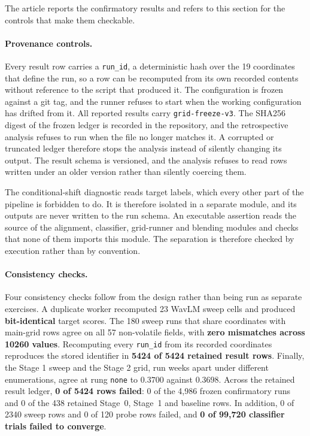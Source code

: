 \documentclass[a4paper,fleqn]{cas-dc}
\begin{document}
The article reports the confirmatory results and refers to this section for
the controls that make them checkable.

\paragraph{Provenance controls.} Every result row carries a
\texttt{run\_id}, a deterministic hash over the 19 coordinates that define the
run, so a row can be recomputed from its own recorded contents without
reference to the script that produced it. The configuration is frozen against a
git tag, and the runner refuses to start when the working configuration has
drifted from it. All reported results carry \texttt{grid-freeze-v3}. The
SHA256 digest of the frozen ledger is recorded in the repository, and the
retrospective analysis refuses to run when the file no longer matches it. A
corrupted or truncated ledger therefore stops the analysis instead of silently
changing its output. The result schema is versioned, and the analysis refuses
to read rows written under an older version rather than silently coercing
them.

The conditional-shift diagnostic reads target labels, which every other part
of the pipeline is forbidden to do. It is therefore isolated in a separate
module, and its outputs are never written to the run schema. An executable
assertion reads the source of the alignment, classifier, grid-runner and
blending modules and checks that none of them imports this module. The
separation is therefore checked by execution rather than by convention.

\paragraph{Consistency checks.} Four consistency checks follow from the design
rather than being run as separate exercises. A duplicate worker recomputed 23
WavLM sweep cells and produced \textbf{bit-identical} target scores. The 180
sweep runs that share coordinates with main-grid rows agree on all 57
non-volatile fields, with \textbf{zero mismatches across 10260 values}.
Recomputing every \texttt{run\_id} from its recorded coordinates reproduces the
stored identifier in \textbf{5424 of 5424 retained result rows}. Finally, the
Stage 1 sweep and the Stage 2 grid, run weeks apart under different
enumerations, agree at rung \texttt{none} to $0.3700$ against $0.3698$. Across
the retained result ledger, \textbf{0 of 5424 rows failed}: 0 of the 4,986
frozen confirmatory runs and 0 of the 438 retained Stage~0, Stage~1 and
baseline rows. In addition, 0 of 2340 sweep rows and 0 of 120 probe rows
failed, and \textbf{0 of 99{,}720 classifier trials failed to converge}.
\end{document}
